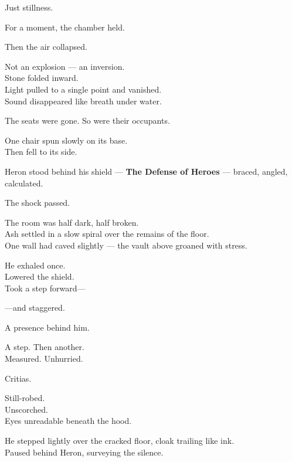 \documentclass[12pt]{article}
\begin{document}
Just stillness.

\vspace{1em}

For a moment, the chamber held.

Then the air collapsed.

\vspace{1em}

Not an explosion — an inversion.\\
Stone folded inward.\\
Light pulled to a single point and vanished.\\
Sound disappeared like breath under water.

The seats were gone.  
So were their occupants.

One chair spun slowly on its base.\\
Then fell to its side.

\vspace{1em}

Heron stood behind his shield — \textbf{The Defense of Heroes} — braced, angled, calculated.

The shock passed.

The room was half dark, half broken.\\
Ash settled in a slow spiral over the remains of the floor.\\
One wall had caved slightly — the vault above groaned with stress.

He exhaled once.\\
Lowered the shield.\\
Took a step forward—

—and staggered.

\vspace{1em}

A presence behind him.

A step. Then another.\\
Measured. Unhurried.

\vspace{1em}

Critias.

Still-robed.\\
Unscorched.\\
Eyes unreadable beneath the hood.

He stepped lightly over the cracked floor, cloak trailing like ink.\\
Paused behind Heron, surveying the silence.

\vspace{1em}
\end{document}
